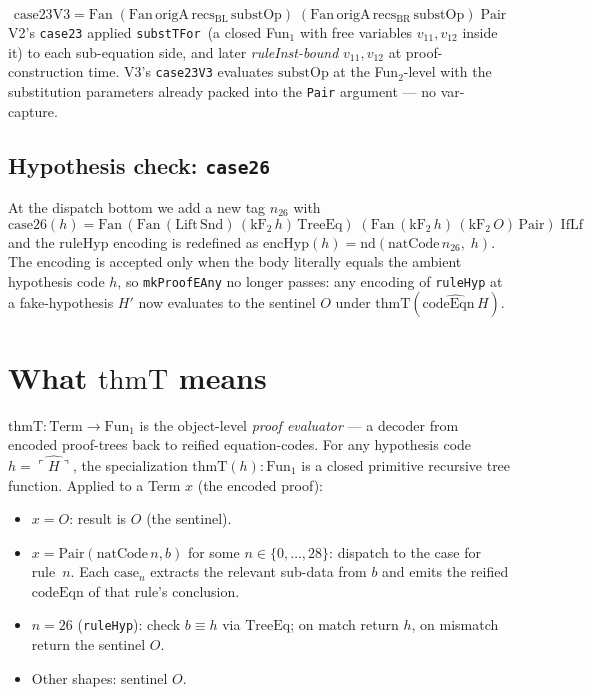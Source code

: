 \documentclass[11pt]{article}
\newcommand{\code}[1]{\ulcorner #1 \urcorner}
\newcommand{\reify}[1]{\widehat{#1}}
\newcommand{\substOp}{\mathrm{substOp}}
\newcommand{\thmT}{\mathrm{thmT}}
\newcommand{\TreeEq}{\mathrm{TreeEq}}
\newcommand{\IfLf}{\mathrm{IfLf}}
\newcommand{\encHyp}{\mathrm{encHyp}}
\begin{document}
$$
\mathrm{case23V3} =
\mathrm{Fan}\;(\mathrm{Fan}\,\mathrm{origA}\,\mathrm{recs_{BL}}\,\substOp)
\;(\mathrm{Fan}\,\mathrm{origA}\,\mathrm{recs_{BR}}\,\substOp)\;\mathrm{Pair}
$$
V2's \texttt{case23} applied \texttt{substTFor}~(a closed Fun$_1$ with
free variables $v_{11}, v_{12}$ inside it) to each sub-equation side,
and later \emph{ruleInst-bound} $v_{11}, v_{12}$ at proof-construction
time.  V3's \texttt{case23V3} evaluates $\substOp$ at the Fun$_2$-level
with the substitution parameters already packed into the
\texttt{Pair} argument --- no var-capture.

\subsection{Hypothesis check: \texttt{case26}}

At the dispatch bottom we add a new tag $n_{26}$ with
$$
\mathrm{case26}(h) =
\mathrm{Fan}\,(\mathrm{Fan}\,(\mathrm{Lift}\,\mathrm{Snd})\,(\mathrm{kF_2}\,h)\,\TreeEq)\;
(\mathrm{Fan}\,(\mathrm{kF_2}\,h)\,(\mathrm{kF_2}\,O)\,\mathrm{Pair})\;\IfLf
$$
and the $\mathrm{ruleHyp}$ encoding is redefined as $\encHyp(h) =
\mathrm{nd}(\mathrm{natCode}\,n_{26},\;h)$.  The encoding is accepted
only when the body literally equals the ambient hypothesis code $h$,
so \texttt{mkProofEAny} no longer passes:
any encoding of \texttt{ruleHyp} at a fake-hypothesis $H'$ now
evaluates to the sentinel $O$ under $\thmT(\reify{\mathrm{codeEqn}\,H})$.

\section{What $\thmT$ means}

$\thmT : \mathrm{Term} \to \mathrm{Fun}_1$ is the object-level
\emph{proof evaluator} --- a decoder from encoded proof-trees back to
reified equation-codes.  For any hypothesis code $h = \reify{\code{H}}$,
the specialization $\thmT(h) : \mathrm{Fun}_1$ is a closed primitive
recursive tree function.  Applied to a Term $x$ (the encoded proof):

\begin{itemize}
\item $x = O$: result is $O$ (the sentinel).
\item $x = \mathrm{Pair}(\mathrm{natCode}\,n, b)$ for some
  $n \in \{0, \ldots, 28\}$: dispatch to the case for rule~$n$.
  Each $\mathrm{case}_n$ extracts the relevant sub-data from $b$ and
  emits the reified $\mathrm{codeEqn}$ of that rule's conclusion.
\item $n = 26$ (\texttt{ruleHyp}): check $b \equiv h$ via $\TreeEq$;
  on match return $h$, on mismatch return the sentinel $O$.
\item Other shapes: sentinel $O$.
\end{itemize}
\end{document}
